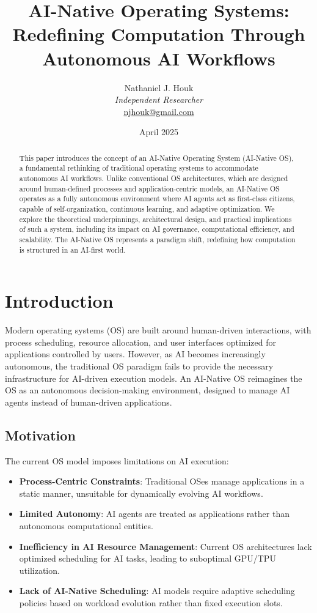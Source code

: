 \documentclass{article}
\title{AI-Native Operating Systems: Redefining Computation Through Autonomous AI Workflows}
\author{Nathaniel J. Houk\\
\textit{Independent Researcher}\\
\href{mailto:njhouk@gmail.com}{njhouk@gmail.com}}
\date{April 2025}
\begin{document}
\maketitle

\begin{abstract}
This paper introduces the concept of an AI-Native Operating System (AI-Native OS), a fundamental rethinking of traditional operating systems to accommodate autonomous AI workflows\cite{houk2025}. Unlike conventional OS architectures, which are designed around human-defined processes and application-centric models, an AI-Native OS operates as a fully autonomous environment where AI agents act as first-class citizens, capable of self-organization, continuous learning, and adaptive optimization. We explore the theoretical underpinnings, architectural design, and practical implications of such a system, including its impact on AI governance, computational efficiency, and scalability. The AI-Native OS represents a paradigm shift, redefining how computation is structured in an AI-first world.
\end{abstract}

\section{Introduction}
Modern operating systems (OS) are built around human-driven interactions, with process scheduling, resource allocation, and user interfaces optimized for applications controlled by users. However, as AI becomes increasingly autonomous, the traditional OS paradigm fails to provide the necessary infrastructure for AI-driven execution models. An AI-Native OS reimagines the OS as an autonomous decision-making environment, designed to manage AI agents instead of human-driven applications.

\subsection{Motivation}
The current OS model imposes limitations on AI execution:
\begin{itemize}
    \item \textbf{Process-Centric Constraints}: Traditional OSes manage applications in a static manner, unsuitable for dynamically evolving AI workflows.
    \item \textbf{Limited Autonomy}: AI agents are treated as applications rather than autonomous computational entities.
    \item \textbf{Inefficiency in AI Resource Management}: Current OS architectures lack optimized scheduling for AI tasks, leading to suboptimal GPU/TPU utilization.
    \item \textbf{Lack of AI-Native Scheduling}: AI models require adaptive scheduling policies based on workload evolution rather than fixed execution slots.
\end{itemize}
\end{document}
